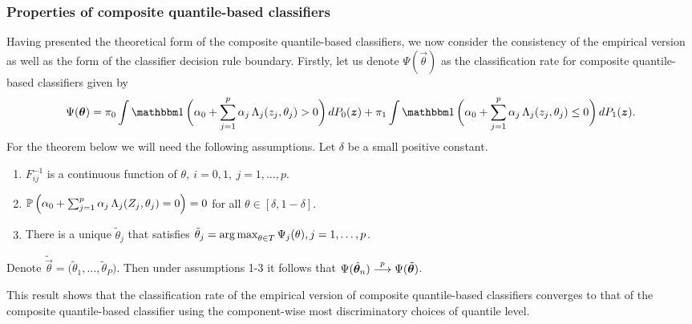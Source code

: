 \subsubsection{Properties of composite quantile-based classifiers}
\label{sec:aggregate-classifier-consistency}

Having presented the theoretical form of the composite quantile-based
classifiers, we now consider the consistency of the empirical version as well as
the form of the classifier decision rule boundary.  Firstly, let us denote
$\Psi(\vec{\theta})$ as the classification rate for composite quantile-based
classifiers given by
\begin{equation}
  \label{eq:multivariate-theoretical-rate}
  \Psi(\vec{\theta}) =
  \pi_0 \int \ind\bigg(
  \alpha_0 + \sum_{j=1}^p \alpha_j \, \Lambda_j (z_j, \theta_j) > 0
  \bigg)\, dP_0(\vec{z}) +
  \pi_1 \int \ind\bigg(
  \alpha_0 + \sum_{j=1}^p \alpha_j \, \Lambda_j (z_j, \theta_j) \leq 0
  \bigg)\, dP_1(\vec{z}).
\end{equation}
For the theorem below we will need the following assumptions.  Let $\delta$ be a
small positive constant.
\begin{enumerate}[label=\emph{Assumption \arabic*.}, align=left]
\item $F_{ij}^{-1}$ is a continuous function of
  $\theta,~ i=0,1,~ j=1, \dots, p$.
\item $\mathbb{P}\,\Big(
  \alpha_0 + \sum_{j=1}^p \alpha_j\, \Lambda_j (Z_j, \theta_j) = 0
  \Big) = 0$ for all
  $\theta \in [\delta, 1 - \delta]$.
\item There is a unique $\tilde{\theta}_j$ that satisfies
  $\tilde{\theta}_j = \operatorname*{arg\,max}_{\theta \in T} \Psi_j(\theta), j = 1, \dots, p$.
\end{enumerate}

\begin{theorem}
  \label{thm:multivariate-consistency}
  Denote
  $\tilde{\vec{\theta}} = \Big( \tilde{\theta}_1, \dots, \tilde{\theta}_P
  \Big)$.  Then under assumptions 1-3 it follows that
  $\Psi(\hat{\bm{\theta}}_n) \stackrel{p}{\longrightarrow} \Psi(\tilde{\bm{\theta}})$.
\end{theorem}
This result shows that the classification rate of the empirical version of
composite quantile-based classifiers converges to that of the composite
quantile-based classifier using the component-wise most discriminatory choices
of quantile level.

